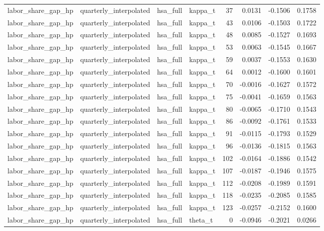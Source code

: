 \begin{tabular}{llllrrrr}
labor\_share\_gap\_hp & quarterly\_interpolated & hsa\_full & kappa\_t & 37 & 0.0131 & -0.1506 & 0.1758 \\
labor\_share\_gap\_hp & quarterly\_interpolated & hsa\_full & kappa\_t & 43 & 0.0106 & -0.1503 & 0.1722 \\
labor\_share\_gap\_hp & quarterly\_interpolated & hsa\_full & kappa\_t & 48 & 0.0085 & -0.1527 & 0.1693 \\
labor\_share\_gap\_hp & quarterly\_interpolated & hsa\_full & kappa\_t & 53 & 0.0063 & -0.1545 & 0.1667 \\
labor\_share\_gap\_hp & quarterly\_interpolated & hsa\_full & kappa\_t & 59 & 0.0037 & -0.1553 & 0.1630 \\
labor\_share\_gap\_hp & quarterly\_interpolated & hsa\_full & kappa\_t & 64 & 0.0012 & -0.1600 & 0.1601 \\
labor\_share\_gap\_hp & quarterly\_interpolated & hsa\_full & kappa\_t & 70 & -0.0016 & -0.1627 & 0.1572 \\
labor\_share\_gap\_hp & quarterly\_interpolated & hsa\_full & kappa\_t & 75 & -0.0041 & -0.1659 & 0.1563 \\
labor\_share\_gap\_hp & quarterly\_interpolated & hsa\_full & kappa\_t & 80 & -0.0065 & -0.1710 & 0.1543 \\
labor\_share\_gap\_hp & quarterly\_interpolated & hsa\_full & kappa\_t & 86 & -0.0092 & -0.1761 & 0.1533 \\
labor\_share\_gap\_hp & quarterly\_interpolated & hsa\_full & kappa\_t & 91 & -0.0115 & -0.1793 & 0.1529 \\
labor\_share\_gap\_hp & quarterly\_interpolated & hsa\_full & kappa\_t & 96 & -0.0136 & -0.1815 & 0.1563 \\
labor\_share\_gap\_hp & quarterly\_interpolated & hsa\_full & kappa\_t & 102 & -0.0164 & -0.1886 & 0.1542 \\
labor\_share\_gap\_hp & quarterly\_interpolated & hsa\_full & kappa\_t & 107 & -0.0187 & -0.1946 & 0.1575 \\
labor\_share\_gap\_hp & quarterly\_interpolated & hsa\_full & kappa\_t & 112 & -0.0208 & -0.1989 & 0.1591 \\
labor\_share\_gap\_hp & quarterly\_interpolated & hsa\_full & kappa\_t & 118 & -0.0235 & -0.2085 & 0.1585 \\
labor\_share\_gap\_hp & quarterly\_interpolated & hsa\_full & kappa\_t & 123 & -0.0257 & -0.2152 & 0.1600 \\
labor\_share\_gap\_hp & quarterly\_interpolated & hsa\_full & theta\_t & 0 & -0.0946 & -0.2021 & 0.0266 \\

\end{tabular}
